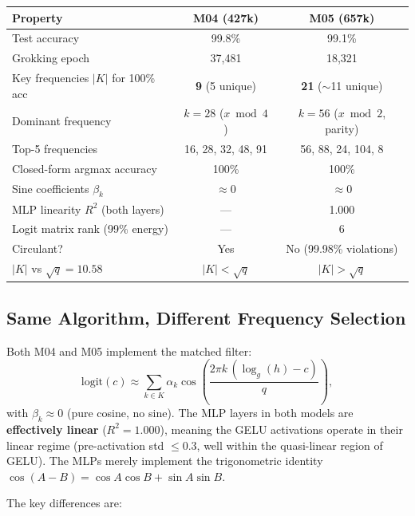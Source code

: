 \documentclass[11pt]{article}
\newcommand{\logg}{\log_g}
\begin{document}
\begin{center}
\begin{tabular}{lcc}
\toprule
\textbf{Property} & \textbf{M04 (427k)} & \textbf{M05 (657k)} \\
\midrule
Test accuracy & 99.8\% & 99.1\% \\
Grokking epoch & 37,481 & 18,321 \\
Key frequencies $|K|$ for 100\% acc & \textbf{9} (5 unique) & \textbf{21} ($\sim$11 unique) \\
Dominant frequency & $k = 28$ ($x \bmod 4$) & $k = 56$ ($x \bmod 2$, parity) \\
Top-5 frequencies & 16, 28, 32, 48, 91 & 56, 88, 24, 104, 8 \\
Closed-form argmax accuracy & 100\% & 100\% \\
Sine coefficients $\beta_k$ & $\approx 0$ & $\approx 0$ \\
MLP linearity $R^2$ (both layers) & --- & 1.000 \\
Logit matrix rank (99\% energy) & --- & 6 \\
Circulant? & Yes & No (99.98\% violations) \\
$|K|$ vs $\sqrt{q} = 10.58$ & $|K| < \sqrt{q}$ & $|K| > \sqrt{q}$ \\
\bottomrule
\end{tabular}
\end{center}

\subsection{Same Algorithm, Different Frequency Selection}

Both M04 and M05 implement the matched filter:
\begin{equation}
    \text{logit}(c) \approx \sum_{k \in K} \alpha_k \cos\!\left(\frac{2\pi k \, (\logg(h) - c)}{q}\right),
\end{equation}
with $\beta_k \approx 0$ (pure cosine, no sine). The MLP layers in both models are \textbf{effectively linear} ($R^2 = 1.000$), meaning the GELU activations operate in their linear regime (pre-activation std $\leq 0.3$, well within the quasi-linear region of GELU). The MLPs merely implement the trigonometric identity $\cos(A - B) = \cos A \cos B + \sin A \sin B$.

The key differences are:
\end{document}
